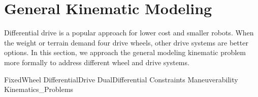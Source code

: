 \hypertarget{Chap:Kinematics}{%
\section{General Kinematic Modeling}\label{Chap:Kinematics}}

Differential drive is a popular approach for lower cost and smaller
robots. When the weight or terrain demand four drive wheels, other drive
systems are better options. In this section, we approach the general
modeling kinematic problem more formally to address different wheel and
drive systems.

FixedWheel DifferentialDrive DualDifferential Constraints
Maneuverability Kinematics\_Problems
